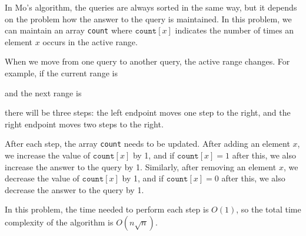 In Mo's algorithm, the queries are always sorted
in the same way, but it depends on the problem
how the answer to the query is maintained.
In this problem, we can maintain an array 
\texttt{count} where $\texttt{count}[x]$
indicates the number of times an element $x$
occurs in the active range.

When we move from one query to another query,
the active range changes.
For example, if the current range is
\begin{center}
\end{center}
and the next range is
\begin{center}
\end{center}
there will be three steps:
the left endpoint moves one step to the right,
and the right endpoint moves two steps to the right.

After each step, the array \texttt{count}
needs to be updated.
After adding an element $x$,
we increase the value of 
$\texttt{count}[x]$ by 1,
and if $\texttt{count}[x]=1$ after this,
we also increase the answer to the query by 1.
Similarly, after removing an element $x$,
we decrease the value of 
$\texttt{count}[x]$ by 1,
and if $\texttt{count}[x]=0$ after this,
we also decrease the answer to the query by 1.

In this problem, the time needed to perform
each step is $O(1)$, so the total time complexity
of the algorithm is $O(n \sqrt n)$.